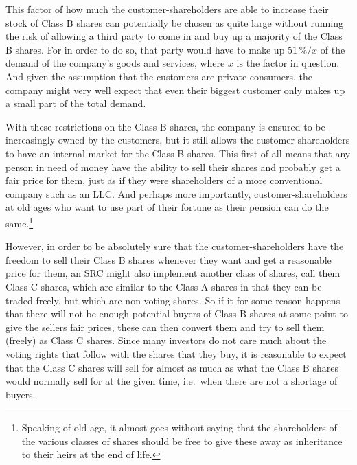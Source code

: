 \documentclass{article}
\begin{document}
This factor of how much the customer-shareholders are able to increase their stock of Class B shares can potentially be chosen as quite large without running the risk of allowing a third party to come in and buy up a majority of the Class B shares. 
For in order to do so, that party would have to make up $51\,\% / x$ of the demand of the company's goods and services, where $x$ is the factor in question. And given the assumption that the customers are private consumers, the company might very well expect that even their biggest customer only makes up a small part of the total demand.




With these restrictions on the Class B shares, the company is ensured to be increasingly owned by the customers, but it still allows the customer-shareholders to have an internal market for the Class B shares. This first of all means that any person in need of money have the ability to sell their shares and probably get a fair price for them, just as if they were shareholders of a more conventional company such as an LLC. And perhaps more importantly, customer-shareholders at old ages who want to use part of their fortune as their pension can do the same.\footnote{
	Speaking of old age, it almost goes without saying that the shareholders of the various classes of shares should be free to give these away as inheritance to their heirs at the end of life. 
}

However, in order to be absolutely sure that the customer-shareholders have the freedom to sell their Class B shares whenever they want and get a reasonable price for them, an SRC might also implement another class of shares, call them Class C shares, which are similar to the Class A shares in that they can be traded freely, but which are non-voting shares. So if it for some reason happens that there will not be enough potential buyers of Class B shares at some point to give the sellers fair prices, these can then convert them and try to sell them (freely) as Class C shares. Since many investors do not care much about the voting rights that follow with the shares that they buy, it is reasonable to expect that the Class C shares will sell for almost as much as what the Class B shares would normally sell for at the given time, i.e.\ when there are not a shortage of buyers. 
\end{document}
